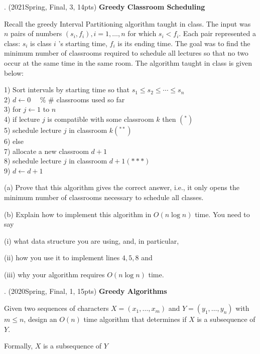 \begin{spacing}{1.3}
    . (2021Spring, Final, 3, 14pts) {\bf Greedy Classroom Scheduling}

    Recall the greedy Interval Partitioning algorithm taught in class. The input was $n$ pairs of numbers $\left(s_{i}, f_{i}\right), i=1, \ldots, n$ for which $s_{i}<f_{i}$. Each pair represented a class: $s_{i}$ is class $i$ 's starting time, $f_{i}$ is its ending time. The goal was to find the minimum number of classrooms required to schedule all lectures so that no two occur at the same time in the same room. The algorithm taught in class is given below:
    
    1) Sort intervals by starting time so that $s_{1} \leq s_{2} \leq \cdots \leq s_{n}$\\
    2) $d \leftarrow 0 \quad$ \% \# classrooms used so far\\
    3) for $j \leftarrow 1$ to $n$\\
    4) \quad if lecture $j$ is compatible with some classroom $k$ then $\left(^{*}\right)$\\
    5) \quad \qquad schedule lecture $j$ in classroom $k\left(^{* *}\right)$\\
    6) \quad else\\
    7) \quad \qquad allocate a new classroom $d+1$\\
    8) \quad \qquad schedule lecture $j$ in classroom $d+1(* * *)$\\
    9) \quad \qquad $d \leftarrow d+1$
    
    (a) Prove that this algorithm gives the correct answer, i.e., it only opens the minimum number of classrooms necessary to schedule all classes.
    
    (b) Explain how to implement this algorithm in $O(n \log n)$ time. You need to say
    
    \qquad (i) what data structure you are using, and, in particular,

    \qquad (ii) how you use it to implement lines $4,5,8$ and

    \qquad (iii) why your algorithm requires $O(n \log n)$ time.

    . (2020Spring, Final, 1, 15pts) {\bf Greedy Algorithms}

    Given two sequences of characters $X=\left(x_{1}, \ldots, x_{m}\right)$ and $Y=\left(y_{1}, \ldots, y_{n}\right)$ with $m \leq n$, design an $O(n)$ time algorithm that determines if $X$ is a subsequence of $Y$.
    
    Formally, $X$ is a subsequence of $Y$


\end{spacing}
